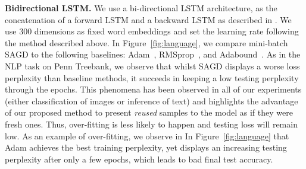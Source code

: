 \documentclass[11pt]{article}
\begin{document}
\begin{table}[H]
\caption{ Test Perplexity of LSTMs on Penn Treebank. Bold number indicates the best result.}\label{tab:ppl}
\end{table}


\textbf{Bidirectional LSTM.}
We use a bi-directional LSTM architecture, as the concatenation of a forward LSTM and a backward LSTM as described in \citep{conneau2017supervised}.
We use $300$ dimensions as fixed word embeddings and set the learning rate following the method described above.
In Figure~\ref{fig:language}, we compare mini-batch SAGD to the following baselines: Adam~\citep{Proc:Kingma_ICLR15},  RMSprop~\citep{tige12}, and Adabound~\citep{Proc:Luo_ICLR19}. 
As in the NLP task on Penn Treebank, we observe that whilst SAGD displays a worse loss perplexity than baseline methods, it succeeds in keeping a low testing perplexity through the epochs.
This phenomena has been observed in all of our experiments (either classification of images or inference of text) and highlights the advantage of our proposed method to present \emph{reused} samples to the model as if they were fresh ones. 
Thus, over-fitting is less likely to happen and testing loss will remain low.
As an example of over-fitting, we observe in In Figure~\ref{fig:language} that Adam achieves the best training perplexity, yet displays an increasing testing perplexity after only a few epochs, which leads to bad final test accuracy.
\end{document}
